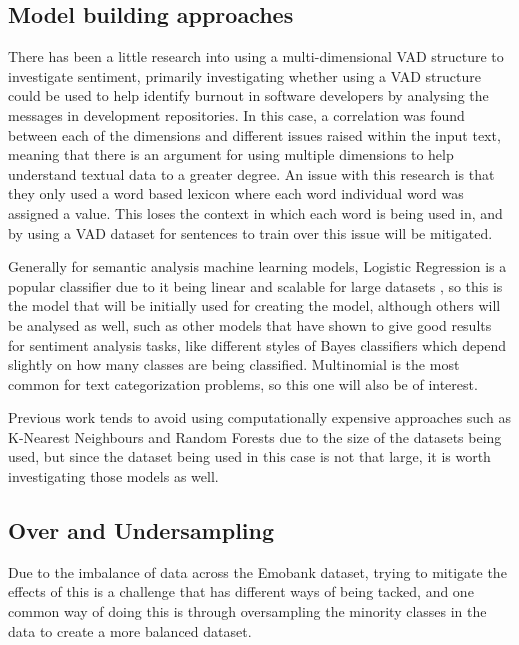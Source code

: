 \subsection{Model building approaches}

There has been a little research into using a multi-dimensional VAD structure to investigate sentiment, primarily investigating whether using a VAD structure could be used to help identify burnout in software developers by analysing the messages in development repositories. \cite{mantyla2016mining} In this case, a correlation was found between each of the dimensions and different issues raised within the input text, meaning that there is an argument for using multiple dimensions to help understand textual data to a greater degree. An issue with this research is that they only used a word based lexicon where each word individual word was assigned a value. This loses the context in which each word is being used in, and by using a VAD dataset for sentences to train over this issue will be mitigated.


Generally for semantic analysis machine learning models, Logistic Regression is a popular classifier due to it being linear and scalable for large datasets \cite{towardsDS}, so this is the model that will be initially used for creating the model, although others will be analysed as well, such as other models that have shown to give good results for sentiment analysis tasks, like different styles of Bayes classifiers which depend slightly on how many classes are being classified. Multinomial is the most common for text categorization problems, so this one will also be of interest. \cite{frank2006naive}

Previous work tends to avoid using computationally expensive approaches such as K-Nearest Neighbours and Random Forests due to the size of the datasets being used, but since the dataset being used in this case is not that large, it is worth investigating those models as well.


\subsection{Over and Undersampling}

Due to the imbalance of data across the Emobank dataset, trying to mitigate the effects of this is a challenge that has different ways of being tacked, and one common way of doing this is through oversampling the minority classes in the data to create a more balanced dataset. \cite{towardsDS}

